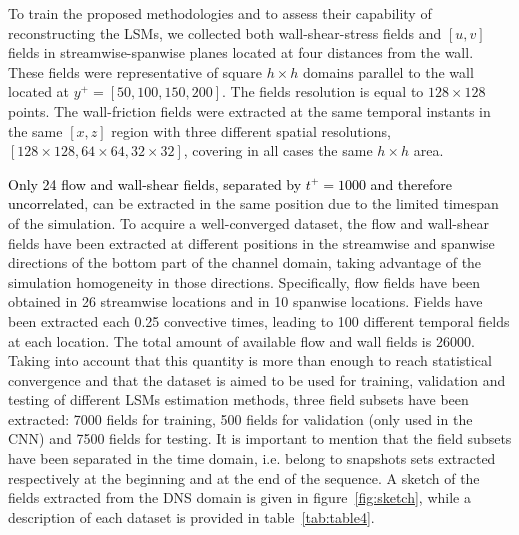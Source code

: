 To train the proposed methodologies and to assess their capability of reconstructing the LSMs, we collected both wall-shear-stress fields and $[u,v]$ fields in streamwise-spanwise planes located at four distances from the wall.
These fields were representative of square $h\times h$ domains parallel to the wall located at $y^+=[50,100,150,200]$.
The fields resolution is equal to $128\times128$ points.
The wall-friction fields were extracted at the same temporal instants in the same $[x,z]$ region with three different spatial resolutions, $[128\times128,64\times64,32\times32]$, covering in all cases the same $h\times h$ area.

\textcolor{black}{Only 24 flow and wall-shear fields, separated by $t^+=1000$ and therefore uncorrelated}, can be extracted in the same position due to the limited timespan of the simulation.
To acquire a well-converged dataset, the flow and wall-shear fields have been extracted at different positions in the streamwise and spanwise directions of the bottom part of the channel domain, taking advantage of the simulation homogeneity in those directions.
Specifically, flow fields have been obtained in 26 streamwise locations and in 10 spanwise locations.
Fields have been extracted each 0.25 convective times, leading to 100 different temporal fields at each location. The total amount of available flow and wall fields is 26000.
Taking into account that this quantity is more than enough to reach statistical convergence and that the dataset is aimed to be used for training, validation and testing of different LSMs estimation methods, three field subsets have been extracted: 7000 fields for training, 500 fields for validation (only used in the CNN) and 7500 fields for testing.
It is important to mention that the field subsets have been separated in the time domain, i.e. belong to snapshots sets extracted respectively at the beginning and at the end of the sequence.
A sketch of the fields extracted from the DNS domain is given in figure~\ref{fig:sketch}, while a description of each dataset is provided in table~\ref{tab:table4}.

